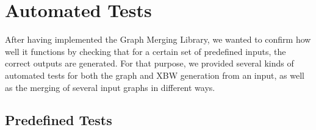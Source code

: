\documentclass[a4paper,12pt,twoside,BCOR=10mm]{scrbook}
\begin{document}
\section{Automated Tests}
%

After having implemented the Graph Merging Library,
we wanted to confirm how well it functions by checking
that for a certain set of predefined inputs, the correct outputs are generated.
For that purpose, we provided several kinds of automated tests for both the
graph and XBW generation from an input, as well as the merging of several input graphs
in different ways.

\subsection{Predefined Tests}
\end{document}
